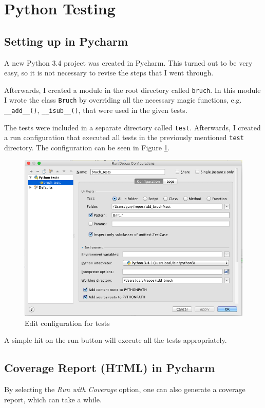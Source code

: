 \documentclass[../main/main.tex]{subfiles}
\begin{document}
\section{Python Testing} 

\subsection{Setting up in Pycharm}

A new Python 3.4 project was created in Pycharm. This turned out to be
very easy, so it is not necessary to revise the steps that I went
through. 

Afterwards, I created a module in the root directory called
\lstinline|bruch|. In this module I wrote the class \lstinline|Bruch|
by overriding all the necessary magic functions,
e.g. \lstinline|__add__()|, \lstinline|__isub__()|, that were used in
the given tests.

The tests were included in a separate directory called
\lstinline|test|. Afterwards, I created a run configuration that
executed all tests in the previously mentioned \lstinline|test|
directory. The configuration can be seen in Figure \ref{fig:edit}.

\begin{figure}[H]
  \centering
  \includegraphics[width=0.7\linewidth]{../figures/edit_config.png}
  \caption{Edit configuration for tests}
  \label{fig:edit}
\end{figure}

A simple hit on the run button will execute all the tests
appropriately.

\subsection{Coverage Report (HTML) in Pycharm}

By selecting the \textit{Run with Coverage} option, one
can also generate a coverage report, which can take a while. 
\end{document}
